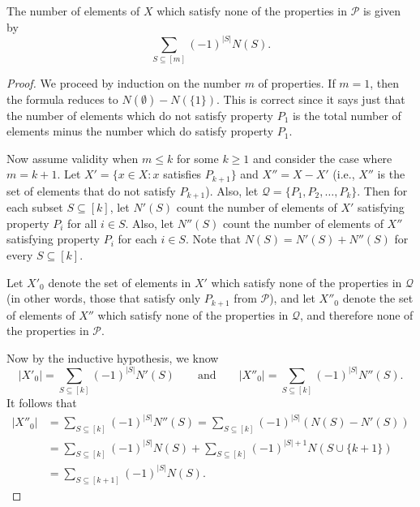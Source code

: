 \begin{theorem}\label{thm:inclusion-exclusion}
The number of elements of $X$ which satisfy none of the properties
in $\mathcal{P}$ is given by
\begin{equation}
\sum_{S\subseteq [m]} (-1)^{|S|}N(S).\label{eq:inclusion-exclusion}
\end{equation}
\end{theorem}
\begin{proof}
  We proceed by induction on the number $m$ of properties. If $m=1$,
  then the formula reduces to $N(\emptyset)-N(\{1\})$.  This is
  correct since it says just that the number of elements which do not
  satisfy property $P_1$ is the total number of elements minus the
  number which do satisfy property $P_1$.

  Now assume validity when $m\le k$ for some $k\ge1$ and consider the
  case where $m=k+1$.  Let $X'=\{x\in X: x$ satisfies $P_{k+1}\}$ and
  $X''=X-X'$ (i.e., $X''$ is the set of elements that do not satisfy
  $P_{k+1}$). Also, let $\mathcal{Q}=\{P_1,P_2,\dots,P_k\}$.  Then for
  each subset $S\subseteq [k]$, let $N'(S)$ count the number of
  elements of $X'$ satisfying property $P_i$ for all $i\in S$.  Also,
  let $N''(S)$ count the number of elements of $X''$ satisfying
  property $P_i$ for each $i\in S$.  Note that $N(S)=N'(S)+N''(S)$ for
  every $S\subseteq [k]$.

  Let $X'_0$ denote the set of elements in $X'$ which satisfy none of
  the properties in $\mathcal{Q}$ (in other words, those that satisfy
  only $P_{k+1}$ from $\mathcal{P}$), and let $X''_0$ denote the set
  of elements of $X''$ which satisfy none of the properties in
  $\mathcal{Q}$, and therefore none of the properties in $\mathcal{P}$.

  Now by the inductive hypothesis, we know
  \[
  |X'_0| = \sum_{S\subseteq [k]} (-1)^{|S|}N'(S)\qquad \text{and}\qquad
 |X''_0| = \sum_{S\subseteq [k]} (-1)^{|S|}N''(S).
\]
It follows that
\begin{align*}
|X''_0| &= \sum_{S\subseteq [k]} (-1)^{|S|}N''(S) = \sum_{S\subseteq [k]} (-1)^{|S|}\left(N(S)-N'(S)\right)\\
        &= \sum_{S\subseteq [k]} (-1)^{|S|}N(S)+
           \sum_{S\subseteq [k]} (-1)^{|S|+1}N(S\cup\{k+1\})\\
        &= \sum_{S\subseteq [k+1]} (-1)^{|S|}N(S).
\end{align*}
\end{proof}

